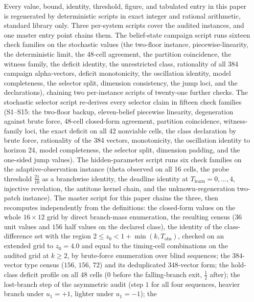 \documentclass[10pt,twocolumn]{article}
\theoremstyle{plain}
\theoremstyle{definition}
\theoremstyle{remark}
\begin{document}
Every value, bound, identity, threshold, figure, and tabulated entry in
this paper is regenerated by deterministic scripts in exact integer and
rational arithmetic, standard library only. Three per-system scripts
cover the audited instances, and one master entry point chains them.
The belief-state campaign script runs sixteen check families on the
stochastic values (the two-floor instance, piecewise-linearity, the
deterministic limit, the 48-cell agreement, the partition coincidence,
the witness family, the deficit identity, the unrestricted class,
rationality of all 384 campaign alpha-vectors, deficit monotonicity, the
oscillation identity, model completeness, the selector split, dimension
consistency, the jump loci, and the declarations), chaining two
per-instance scripts of twenty-one further checks. The stochastic
selector script re-derives every selector claim in fifteen check
families (S1--S15: the two-floor backup, eleven-belief piecewise
linearity, degeneration against brute force, 48-cell closed-form
agreement, partition coincidence, witness-family loci, the exact
deficit on all 42 nonviable cells, the class declaration by brute
force, rationality of the 384 vectors, monotonicity, the oscillation
identity to horizon 24, model completeness, the selector split,
dimension padding, and the one-sided jump values). The hidden-parameter
script runs six check families on the adaptive-observation instance
(theta observed on all 16 cells, the probe threshold
\(\tfrac{21}{10}\) as a branchwise identity, the deadline identity at
\(T_{\mathrm{learn}} = 0, \dots, 4\), injective revelation, the
antitone kernel chain, and the unknown-regeneration two-patch
instance). The master script for this paper chains the three, then
recomputes independently from the definitions: the closed-form values on
the whole \(16 \times 12\) grid by direct branch-mass enumeration, the
resulting census (\(36\) unit values and \(156\) half values on the
declared class), the identity of the class-difference set with the region
\(2 \le z_{0} < 1 + \min(k, T_{\mathrm{obs}})\), checked on an
extended grid to \(z_{0} = 4.0\) and equal to the timing-cell
combinations on the audited grid at \(k \ge 2\), by brute-force
enumeration over blind sequences; the \(384\)-vector type census
(\(156\), \(156\), \(72\)) and its deduplicated \(348\)-vector
form; the hold-class deficit profile on all 48 cells (\(0\) before the
falling-branch exit, \(\tfrac{1}{2}\) after); the lost-branch step of
the asymmetric audit (step \(1\) for all four sequences, heavier
branch under \(u_{1} = +1\), lighter under \(u_{1} = -1\)); the
\end{document}
